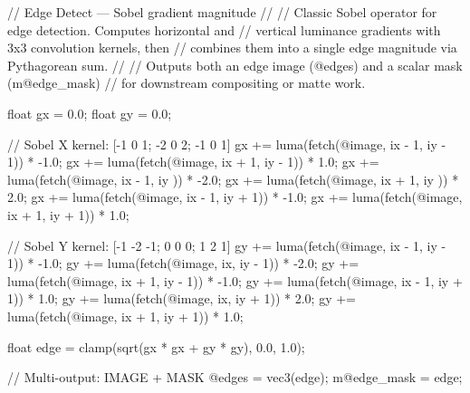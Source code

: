 // Edge Detect — Sobel gradient magnitude
//
// Classic Sobel operator for edge detection. Computes horizontal and
// vertical luminance gradients with 3x3 convolution kernels, then
// combines them into a single edge magnitude via Pythagorean sum.
//
// Outputs both an edge image (@edges) and a scalar mask (m@edge_mask)
// for downstream compositing or matte work.

float gx = 0.0;
float gy = 0.0;

// Sobel X kernel: [-1 0 1; -2 0 2; -1 0 1]
gx += luma(fetch(@image, ix - 1, iy - 1)) * -1.0;
gx += luma(fetch(@image, ix + 1, iy - 1)) *  1.0;
gx += luma(fetch(@image, ix - 1, iy    )) * -2.0;
gx += luma(fetch(@image, ix + 1, iy    )) *  2.0;
gx += luma(fetch(@image, ix - 1, iy + 1)) * -1.0;
gx += luma(fetch(@image, ix + 1, iy + 1)) *  1.0;

// Sobel Y kernel: [-1 -2 -1; 0 0 0; 1 2 1]
gy += luma(fetch(@image, ix - 1, iy - 1)) * -1.0;
gy += luma(fetch(@image, ix,     iy - 1)) * -2.0;
gy += luma(fetch(@image, ix + 1, iy - 1)) * -1.0;
gy += luma(fetch(@image, ix - 1, iy + 1)) *  1.0;
gy += luma(fetch(@image, ix,     iy + 1)) *  2.0;
gy += luma(fetch(@image, ix + 1, iy + 1)) *  1.0;

float edge = clamp(sqrt(gx * gx + gy * gy), 0.0, 1.0);

// Multi-output: IMAGE + MASK
@edges = vec3(edge);
m@edge_mask = edge;